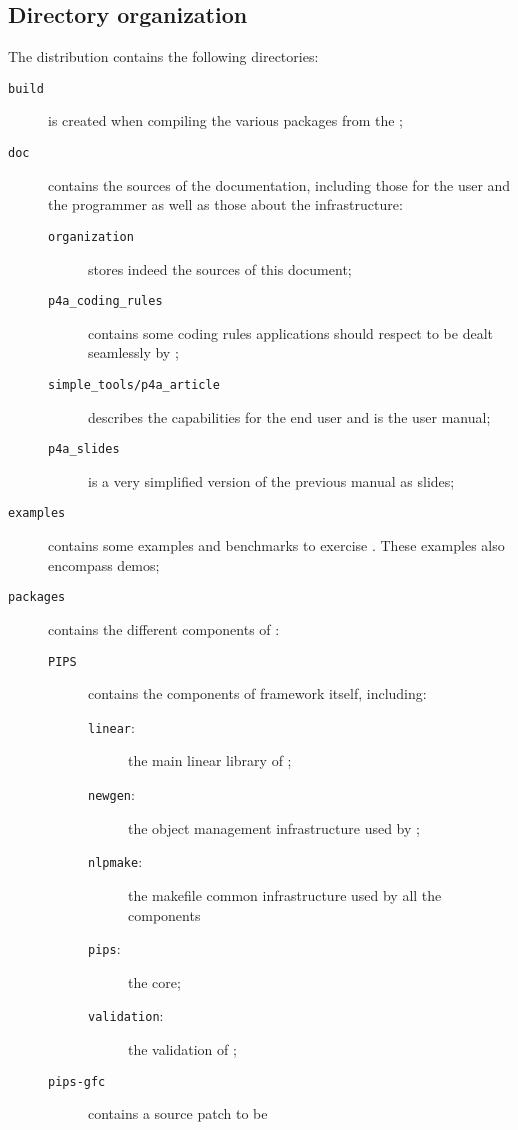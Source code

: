 \documentclass[a4paper]{article}
\begin{document}
\subsection{Directory organization}
\label{sec:direct-organ}
The \Apfa distribution contains the following directories:

\begin{description}
\item[\texttt{build}] is created when compiling the various
  \Apfa packages from the \Aautotools;
\item[\texttt{doc}] contains the sources of the \Apfa documentation,
  including those for the user and the programmer as well as those
  about the infrastructure:
  \begin{description}
  \item[\texttt{organization}] stores indeed the sources of this document;
  \item[\texttt{p4a\_coding\_rules}] contains some coding rules
    applications should respect to be dealt seamlessly by \Apfa;
  \item[\texttt{simple\_tools/p4a\_article}] describes the \Apfa
    capabilities for the end user and is the user manual;
  \item[\texttt{p4a\_slides}] is a very simplified version of the previous
    manual as slides;
  \end{description}
\item[\texttt{examples}] contains some examples and benchmarks to exercise
  \Apfa. These examples also encompass \Apfa demos;
\item[\texttt{packages}] contains the different components of \Apfa:
  \begin{description}
  \item[\texttt{PIPS}] contains the components of \Apips framework
    itself, including:
    \begin{description}
    \item[\texttt{linear}:] the main linear library of \Apips;
    \item[\texttt{newgen}:] the object management infrastructure used by
      \Apips;
    \item[\texttt{nlpmake}:] the makefile common infrastructure used by
      all the \Apips components
    \item[\texttt{pips}:] the \Apips core;
    \item[\texttt{validation}:] the validation of \Apips;
    \end{description}
  \item[\texttt{pips-gfc}] contains a  source patch to be

\end{description}
\end{description}
\end{document}
